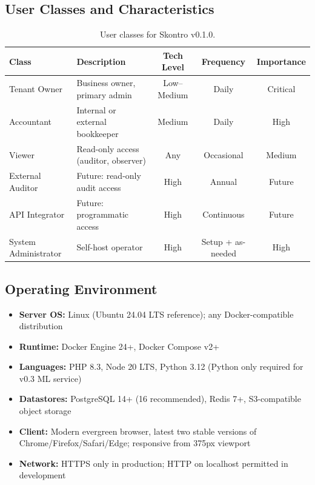\documentclass[11pt,a4paper]{article}
\begin{document}
\subsection{User Classes and Characteristics}

\begin{table}[H]
\centering
\small
\begin{tabularx}{\textwidth}{lXccc}
\toprule
\textbf{Class} & \textbf{Description} & \textbf{Tech Level} & \textbf{Frequency} & \textbf{Importance} \\
\midrule
Tenant Owner & Business owner, primary admin & Low--Medium & Daily & Critical \\
Accountant & Internal or external bookkeeper & Medium & Daily & High \\
Viewer & Read-only access (auditor, observer) & Any & Occasional & Medium \\
External Auditor & Future: read-only audit access & High & Annual & Future \\
API Integrator & Future: programmatic access & High & Continuous & Future \\
System Administrator & Self-host operator & High & Setup + as-needed & High \\
\bottomrule
\end{tabularx}
\caption{User classes for Skontro v0.1.0.}
\end{table}

\subsection{Operating Environment}

\begin{itemize}
    \item \textbf{Server OS:} Linux (Ubuntu 24.04 LTS reference); any Docker-compatible distribution
    \item \textbf{Runtime:} Docker Engine 24+, Docker Compose v2+
    \item \textbf{Languages:} PHP 8.3, Node 20 LTS, Python 3.12 (Python only required for v0.3 ML service)
    \item \textbf{Datastores:} PostgreSQL 14+ (16 recommended), Redis 7+, S3-compatible object storage
    \item \textbf{Client:} Modern evergreen browser, latest two stable versions of Chrome/Firefox/Safari/Edge; responsive from 375px viewport
    \item \textbf{Network:} HTTPS only in production; HTTP on localhost permitted in development
\end{itemize}
\end{document}
